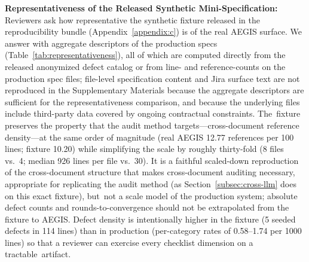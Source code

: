\documentclass[software,article,accept,pdftex,oneauthor]{Definitions/mdpi}
\def\hl#1{#1}
\begin{document}
\textbf{\hl{Representativeness of the Released Synthetic Mini-Specification:}} Reviewers ask how representative the synthetic fixture released in the reproducibility bundle (Appendix~\ref{appendix:c}) is of the real AEGIS surface. We answer with aggregate descriptors of the production specs (Table~\ref{tab:representativeness}), all of which are computed directly from the released anonymized defect catalog or from line- and reference-counts on the production spec files; file-level specification content and Jira surface text are not reproduced in the \hl{Supplementary Materials} %
 because the aggregate descriptors are sufficient for the representativeness comparison, and because the underlying files include third-party data covered by ongoing contractual constraints. The~fixture preserves the property that the audit method targets---cross-document reference density---at the same order of magnitude (real AEGIS 12.77 references per 100 lines; fixture 10.20) while simplifying the scale by roughly thirty-fold (8 files vs.\ 4; median 926 lines per file vs.\ 30). It is a faithful scaled-down reproduction of the cross-document structure that makes cross-document auditing necessary, appropriate for replicating the audit method (as Section~\ref{subsec:cross-llm} does on this exact fixture), but~not a scale model of the production system; absolute defect counts and rounds-to-convergence should not be extrapolated from the fixture to AEGIS. Defect density is intentionally higher in the fixture (5 seeded defects in 114 lines) than in production (per-category rates of 0.58--1.74 per 1000 lines) so that a reviewer can exercise every checklist dimension on a tractable~artifact.
\end{document}
